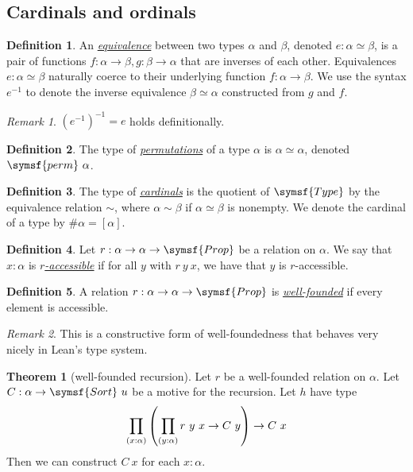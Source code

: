 \documentclass{article}
\newcommand{\mdef}[3]{\href{https://leanprover-community.github.io/mathlib4\_docs/Mathlib/#1.html\##2}{\emph{#3}}}
\theoremstyle{definition}
\newtheorem{definition}{Definition}[section]
\newtheorem{theorem}{Theorem}[section]
\theoremstyle{remark}
\newtheorem*{remark}{Remark}
\begin{document}
\subsection{Cardinals and ordinals}

\begin{definition}
    An \mdef{Logic/Equiv/Defs}{Equiv}{equivalence} between two types \( \alpha \) and \( \beta \), denoted \( e : \alpha \simeq \beta \), is a pair of functions \( f \colon \alpha \to \beta, g \colon \beta \to \alpha \) that are inverses of each other.
    Equivalences \( e : \alpha \simeq \beta \) naturally coerce to their underlying function \( f : \alpha \to \beta \).
    We use the syntax \( e^{-1} \) to denote the inverse equivalence \( \beta \simeq \alpha \) constructed from \( g \) and \( f \).
\end{definition}
\begin{remark}
    \( (e^{-1})^{-1} = e \) holds definitionally.
\end{remark}
\begin{definition}
    The type of \mdef{Logic/Equiv/Defs}{Equiv.Perm}{permutations} of a type \( \alpha \) is \( \alpha \simeq \alpha \), denoted \( \symsf{perm}\ \alpha \).
\end{definition}
\begin{definition}
    The type of \mdef{SetTheory/Cardinal/Basic}{Cardinal}{cardinals} is the quotient of \( \symsf{Type} \) by the equivalence relation \( \sim \), where \( \alpha \sim \beta \) if \( \alpha \simeq \beta \) is nonempty.
    We denote the cardinal of a type by \( \#\alpha = [\alpha] \).
\end{definition}
\begin{definition}
    Let \( r : \alpha \to \alpha \to \symsf{Prop} \) be a relation on \( \alpha \).
    We say that \( x : \alpha \) is \mdef{Init/WF}{Acc}{\( r \)-accessible} if for all \( y \) with \( r\ y\ x \), we have that \( y \) is \( r \)-accessible.
\end{definition}
\begin{definition}
    A relation \( r : \alpha \to \alpha \to \symsf{Prop} \) is \mdef{Init/WF}{WellFounded}{well-founded} if every element is accessible.
\end{definition}
\begin{remark}
    This is a constructive form of well-foundedness that behaves very nicely in Lean's type system.
\end{remark}
\begin{theorem}[well-founded recursion]
    Let \( r \) be a well-founded relation on \( \alpha \).
    Let \( C : \alpha \to \symsf{Sort}\ u \) be a motive for the recursion.
    Let \( h \) have type
    \[ \prod_{(x : \alpha)} \qty(\prod_{(y : \alpha)} r\ y\ x \to C\ y) \to C\ x \]
    Then we can construct \( C\ x \) for each \( x : \alpha \).
\end{theorem}
\end{document}
